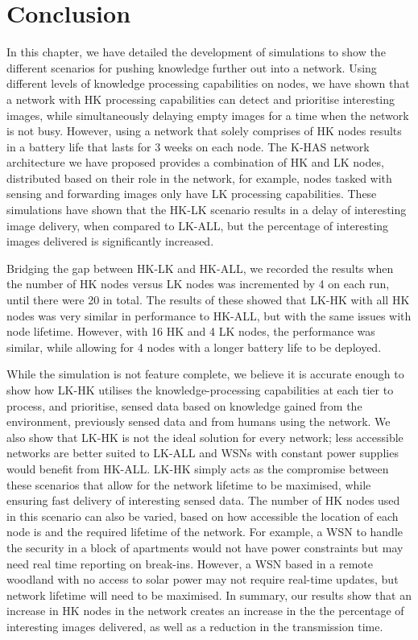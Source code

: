 \section{Conclusion}
	
In this chapter, we have detailed the development of simulations to show the different scenarios for pushing knowledge further out into a network. Using different levels of knowledge processing capabilities on nodes, we have shown that a network with HK processing capabilities can detect and prioritise interesting images, while simultaneously delaying empty images for a time when the network is not busy. However, using a network that solely comprises of HK nodes results in a battery life that lasts for 3 weeks on each node. The K-HAS network architecture we have proposed provides a combination of HK and LK nodes, distributed based on their role in the network, for example, nodes tasked with sensing and forwarding images only have LK processing capabilities. These simulations have shown that the HK-LK scenario results in a delay of interesting image delivery, when compared to LK-ALL, but the percentage of interesting images delivered is significantly increased.

Bridging the gap between HK-LK and HK-ALL, we recorded the results when the number of HK nodes versus LK nodes was incremented by 4 on each run, until there were 20 in total. The results of these showed that LK-HK with all HK nodes was very similar in performance to HK-ALL, but with the same issues with node lifetime. However, with 16 HK and 4 LK nodes, the performance was similar, while allowing for 4 nodes with a longer battery life to be deployed.

While the simulation is not feature complete, we believe it is accurate enough to show how LK-HK utilises the knowledge-processing capabilities at each tier to process, and prioritise, sensed data based on knowledge gained from the environment, previously sensed data and from humans using the network. We also show that LK-HK is not the ideal solution for every network; less accessible networks are better suited to LK-ALL and WSNs with constant power supplies would benefit from HK-ALL. LK-HK simply acts as the compromise between these scenarios that allow for the network lifetime to be maximised, while ensuring fast delivery of interesting sensed data. The number of HK nodes used in this scenario can also be varied, based on how accessible the location of each node is and the required lifetime of the network. For example, a WSN to handle the security in a block of apartments would not have power constraints but may need real time reporting on break-ins. However, a WSN based in a remote woodland with no access to solar power may not require real-time updates, but network lifetime will need to be maximised. In summary, our results show that an increase in HK nodes in the network creates an increase in the the percentage of interesting images delivered, as well as a reduction in the transmission time.

